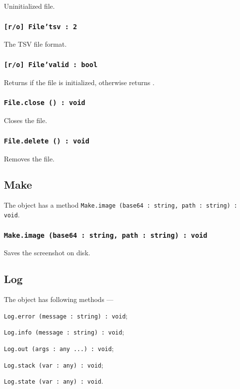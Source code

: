 Uninitialized file.

\subsubsection{\texttt{[r/o] File'tsv : 2}}

The TSV file format.

\subsubsection{\texttt{[r/o] File'valid : bool}}

Returns \true{} if the file is initialized, otherwise returns \false.

\subsubsection{\texttt{File.close () : void}}

Closes the file.

\subsubsection{\texttt{File.delete () : void}}

Removes the file.

\subsection{Make}

The object \make{} has a method \texttt{Make.image (base64 : string, path : string) : void}.

\subsubsection{\texttt{Make.image (base64 : string, path : string) : void}}

Saves the screenshot on disk.

\subsection{Log}

The object \logtype{} has following methods —
\begin{icItems}
	\item \texttt{Log.error (message : string) : void};
	\item \texttt{Log.info (message : string) : void};
	\item \texttt{Log.out (args : any ...) : void};
	\item \texttt{Log.stack (var : any) : void};
	\item \texttt{Log.state (var : any) : void}.
\end{icItems}

